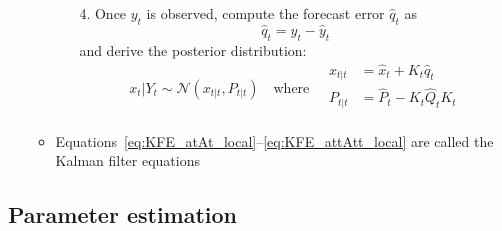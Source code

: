\documentclass[12pt,a4paper]{article}
\begin{document}
\begin{itemize}
\begin{itemize}
\begin{itemize}
    \item[4.] Once $y_{t}$ is observed,
      compute the forecast error $\hat{q}_{t}$ as
      \begin{equation}\label{eq:KFE_et_local}%
        \hat{q}_{t} = y_{t} - \hat{y}_{t}
      \end{equation}
      and derive the posterior distribution:
      \begin{equation}\label{eq:KFE_attAtt_local}%
        x_{t}|Y_{t}\sim \mathcal{N}(x_{t|t},P_{t|t})
        \quad\text{where}\quad
        \begin{aligned}
          x_{t|t} & = \hat{x}_{t} + K_{t}\hat{q}_{t} \\
          P_{t|t} & = \hat{P}_{t} - K_{t}\hat{Q}_{t}K_{t} \\
        \end{aligned}
      \end{equation}

    \end{itemize}

  \item Equations~\eqref{eq:KFE_atAt_local}--\eqref{eq:KFE_attAtt_local}
    are called the Kalman filter equations

  \end{itemize}
  
\end{itemize}

\subsection{Parameter estimation}
\end{document}
